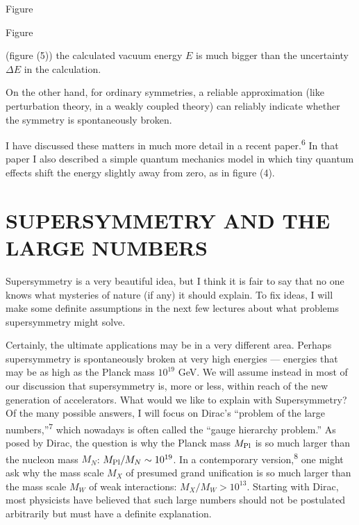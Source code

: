 \begin{center}
\begin{minipage}{0.42\textwidth}
\centering
{}
\par\smallskip
Figure~\thefigure
\end{minipage}\hfill
\begin{minipage}{0.42\textwidth}
\centering
{}
\par\smallskip
Figure~\thefigure
\end{minipage}
\end{center}

(figure (5)) the calculated vacuum energy $E$ is much bigger than the
uncertainty $\Delta E$ in the calculation.

On the other hand, for ordinary symmetries, a reliable approximation
(like perturbation theory, in a weakly coupled theory) can
reliably indicate whether the symmetry is spontaneously broken.

I have discussed these matters in much more detail in a recent
paper.\textsuperscript{6} In that paper I also described a simple quantum mechanics
model in which tiny quantum effects shift the energy slightly away
from zero, as in figure (4).

\section{SUPERSYMMETRY AND THE LARGE NUMBERS}

Supersymmetry is a very beautiful idea, but I think it is fair
to say that no one knows what mysteries of nature (if any) it should
explain. To fix ideas, I will make some definite assumptions in the
next few lectures about what problems supersymmetry might solve.

Certainly, the ultimate applications may be in a very different area.
Perhaps supersymmetry is spontaneously broken at very high
energies --- energies that may be as high as the Planck mass $10^{19}$ GeV.
We will assume instead in most of our discussion that supersymmetry
is, more or less, within reach of the new generation of accelerators.
What would we like to explain with Supersymmetry? Of the many
possible answers, I will focus on Dirac's ``problem of the large numbers,''\textsuperscript{7}
which nowadays is often called the ``gauge hierarchy problem.''
As posed by Dirac, the question is why the Planck mass $M_{\rm Pl}$ is so much
larger than the nucleon mass $M_N$: $M_{\rm Pl}/M_N \sim 10^{19}$. In a contemporary
version,\textsuperscript{8} one might ask why the mass scale $M_X$ of presumed grand unification
is so much larger than the mass scale $M_W$ of weak interactions:
$M_X/M_W > 10^{13}$. Starting with Dirac, most physicists have believed
that such large numbers should not be postulated arbitrarily
but must have a definite explanation.

